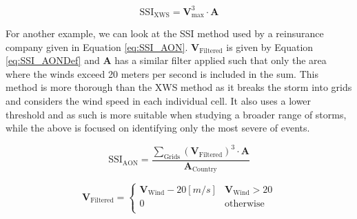         \begin{equation}
            \label{eq:SSI_XWS}
            \text{SSI}_{\text{XWS}} = \mathbf{V}_{\text{max}}^3 \cdot \mathbf{A}
        \end{equation}

        For another example, we can look at the SSI method used by a reinsurance company given in Equation \ref{eq:SSI_AON}. $\mathbf{V}_{\text{Filtered}}$ is given by Equation \ref{eq:SSI_AONDef} and $\mathbf{A}$ has a similar filter applied such that only the area where the winds exceed 20 meters per second is included in the sum. This method is more thorough than the XWS method as it breaks the storm into grids and considers the wind speed in each individual cell. It also uses a lower threshold and as such is more suitable when studying a broader range of storms, while the above is focused on identifying only the most severe of events.

        \begin{equation}
            \label{eq:SSI_AON}
            \text{SSI}_{\text{AON}} = \frac{\sum_{\text{Grids}}\left(\mathbf{V}_{\text{Filtered}}\right)^3 \cdot \mathbf{A}}{\mathbf{A}_{\text{Country}}}
        \end{equation}

        \begin{equation}
            \label{eq:SSI_AONDef}
            \mathbf{V}_{\text{Filtered}} = 
                \begin{cases}
                    \mathbf{V}_{\text{Wind}} - 20\left[m/s\right] & \mathbf{V}_{\text{Wind}} > 20 \\
                    0                                             & \text{otherwise} \\
                \end{cases}
        \end{equation}